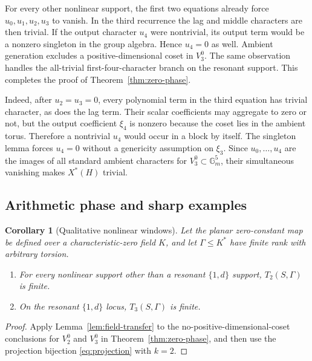 \documentclass[11pt]{article}
\newtheorem{corollary}[theorem]{Corollary}
\theoremstyle{definition}
\theoremstyle{remark}
\newcommand{\Gm}{\mathbb{G}_{m}}
\newcommand{\Gam}{\Gamma}
\begin{document}
For every other nonlinear support, the first two equations already force $u_0,u_1,u_2,u_3$ to vanish.  In the third recurrence the lag and middle characters are then trivial.  If the output character $u_4$ were nontrivial, its output term would be a nonzero singleton in the group algebra.  Hence $u_4=0$ as well.  Ambient generation excludes a positive-dimensional coset in $V_3^0$.  The same observation handles the all-trivial first-four-character branch on the resonant support.  This completes the proof of Theorem~\ref{thm:zero-phase}.

Indeed, after $u_2=u_3=0$, every polynomial term in the third equation has
trivial character, as does the lag term.  Their scalar coefficients may
aggregate to zero or not, but the output coefficient $\xi_4$ is nonzero
because the coset lies in the ambient torus.  Therefore a nontrivial $u_4$
would occur in a block by itself.  The singleton lemma forces $u_4=0$
without a genericity assumption on $\xi_3$.  Since
$u_0,\ldots,u_4$ are the images of all standard ambient characters for
$V_3^0\subset\Gm^5$, their simultaneous vanishing makes $X^*(H)$ trivial.

\subsection{Arithmetic phase and sharp examples}

\begin{corollary}[Qualitative nonlinear windows]
\label{cor:zero-arithmetic}
Let the planar zero-constant map be defined over a characteristic-zero field $K$, and let $\Gam\leq K^*$ have finite rank with arbitrary torsion.
\begin{enumerate}[label=(\roman*)]
\item For every nonlinear support other than a resonant $\{1,d\}$ support, $T_2(S,\Gam)$ is finite.
\item On the resonant $\{1,d\}$ locus, $T_3(S,\Gam)$ is finite.
\end{enumerate}
\end{corollary}

\begin{proof}
Apply Lemma~\ref{lem:field-transfer} to the no-positive-dimensional-coset conclusions for $V_2^0$ and $V_3^0$ in Theorem~\ref{thm:zero-phase}, and then use the projection bijection \eqref{eq:projection} with $k=2$.
\end{proof}
\end{document}
